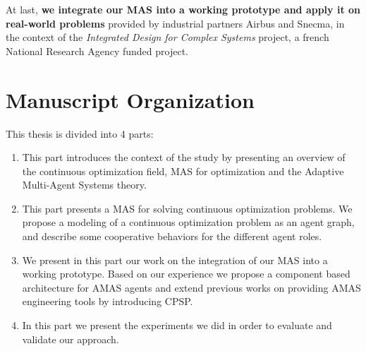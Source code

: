 At last, \textbf{we integrate our MAS into a working prototype and apply it on real-world problems} provided by industrial partners Airbus and Snecma, in the context of the \emph{Integrated Design for Complex Systems} project, a french National Research Agency funded project.

\pagebreak
\section*{Manuscript Organization}
This thesis is divided into 4 parts:
\begin{enumerate}[P{a}rt I.] %
\item This part introduces the context of the study by presenting an overview of the continuous optimization field, MAS for optimization and the Adaptive Multi-Agent Systems theory.
\item This part presents a MAS for solving continuous optimization problems. We propose a modeling of a continuous optimization problem as an agent graph, and describe some cooperative behaviors for the different agent roles.
\item We present in this part our work on the integration of our MAS into a working prototype. Based on our experience we propose a component based architecture for AMAS agents and extend previous works on providing AMAS engineering tools by introducing CPSP.
\item In this part we present the experiments we did in order to evaluate and validate our approach.
\end{enumerate}